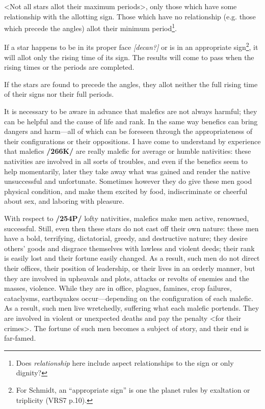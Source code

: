 <Not  all stars allot their maximum periods>, only those which have some relationship with the allotting sign. Those which have no relationship (e.g. those which precede the angles) allot their minimum period\footnote{Does \textsl{relationship} here include aspect relationships to the sign or only dignity?}.

If  a star happens to be in its proper face \textsl{[decan?]} or is in an appropriate sign\footnote{For Schmidt, an ``appropriate sign'' is one the planet rules by exaltation or triplicity (VRS7 p.10).}, it will allot only the rising time of its sign. The results will come to pass when the rising times or the periods are completed. 

If  the stars are found to precede the angles, they allot neither the full rising time of their signs nor their full periods.

It  is necessary to be aware in advance that malefics are not always harmful; they can be helpful and the cause of life and rank. In the same way benefics can bring dangers and harm—all of which can be foreseen through the appropriateness of their configurations or their oppositions. I have come to understand by experience that malefics \textbf{/266K/} are really malefic for average or humble nativities: these nativities are involved in all sorts of troubles, and even if the benefics seem to help momentarily, later they take away what was gained and render the native unsuccessful and unfortunate. Sometimes however they do give these men good physical condition, and make them excited by food, indiscriminate or cheerful about sex, and laboring with pleasure.

 
With  respect to \textbf{/254P/} lofty nativities, malefics make men active, renowned, successful. Still, even then these stars do not cast off their own nature: these men have a bold, terrifying, dictatorial, greedy, and destructive nature; they desire others’ goods and disgrace themselves with lawless and violent deeds; their rank is easily lost and their fortune easily changed. As a result, such men do not direct their offices, their position of leadership, or their lives in an orderly manner, but they are involved in upheavals and plots, attacks or revolts of enemies and the masses, violence. While they are in office, plagues, famines, crop failures, cataclysms, earthquakes occur—depending on the configuration of each malefic. As a result, such men live wretchedly, suffering what each malefic portends. They are involved in violent or unexpected deaths and pay the penalty <for their crimes>. The fortune of such men becomes a subject of story, and
their end is far-famed. 


